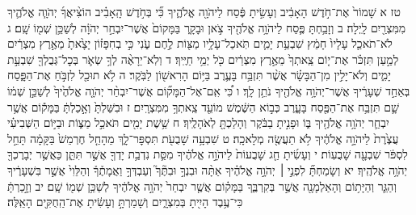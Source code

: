 \documentclass[twoside, openany, parskip=half, 11pt]{book}
\begin{document}
טז א שָׁמוֹר֙ אֶת־חֹ֣דֶשׁ הָאָבִ֔יב וְעָשִׂ֣יתָ פֶּ֔סַח לַיהֹוָ֖ה אֱלֹהֶ֑יךָ כִּ֞י בְּחֹ֣דֶשׁ הָֽאָבִ֗יב הוֹצִ֨יאֲךָ֜ יְהֹוָ֧ה אֱלֹהֶ֛יךָ מִמִּצְרַ֖יִם לָֽיְלָה׃ ב וְזָבַ֥חְתָּ פֶּ֛סַח לַיהֹוָ֥ה אֱלֹהֶ֖יךָ צֹ֣אן וּבָקָ֑ר בַּמָּקוֹם֙ אֲשֶׁר־יִבְחַ֣ר יְהֹוָ֔ה לְשַׁכֵּ֥ן שְׁמ֖וֹ שָֽׁם׃ ג לֹא־תֹאכַ֤ל עָלָיו֙ חָמֵ֔ץ שִׁבְעַ֥ת יָמִ֛ים תֹּֽאכַל־עָלָ֥יו מַצּ֖וֹת לֶ֣חֶם עֹ֑נִי כִּ֣י בְחִפָּז֗וֹן יָצָ֙אתָ֙ מֵאֶ֣רֶץ מִצְרַ֔יִם לְמַ֣עַן תִּזְכֹּ֗ר אֶת־י֤וֹם צֵֽאתְךָ֙ מֵאֶ֣רֶץ מִצְרַ֔יִם כֹּ֖ל יְמֵ֥י חַיֶּֽיךָ׃ ד וְלֹֽא־יֵרָאֶ֨ה לְךָ֥ שְׂאֹ֛ר בְּכׇל־גְּבֻלְךָ֖ שִׁבְעַ֣ת יָמִ֑ים וְלֹא־יָלִ֣ין מִן־הַבָּשָׂ֗ר אֲשֶׁ֨ר תִּזְבַּ֥ח בָּעֶ֛רֶב בַּיּ֥וֹם הָרִאשׁ֖וֹן לַבֹּֽקֶר׃ ה לֹ֥א תוּכַ֖ל לִזְבֹּ֣חַ אֶת־הַפָּ֑סַח בְּאַחַ֣ד שְׁעָרֶ֔יךָ אֲשֶׁר־יְהֹוָ֥ה אֱלֹהֶ֖יךָ נֹתֵ֥ן לָֽךְ׃ ו כִּ֠י אִֽם־אֶל־הַמָּק֞וֹם אֲשֶׁר־יִבְחַ֨ר יְהֹוָ֤ה אֱלֹהֶ֙יךָ֙ לְשַׁכֵּ֣ן שְׁמ֔וֹ שָׁ֛ם תִּזְבַּ֥ח אֶת־הַפֶּ֖סַח בָּעָ֑רֶב כְּב֣וֹא הַשֶּׁ֔מֶשׁ מוֹעֵ֖ד צֵֽאתְךָ֥ מִמִּצְרָֽיִם׃ ז וּבִשַּׁלְתָּ֙ וְאָ֣כַלְתָּ֔ בַּמָּק֕וֹם אֲשֶׁ֥ר יִבְחַ֛ר יְהֹוָ֥ה אֱלֹהֶ֖יךָ בּ֑וֹ וּפָנִ֣יתָ בַבֹּ֔קֶר וְהָלַכְתָּ֖ לְאֹהָלֶֽיךָ׃ ח שֵׁ֥שֶׁת יָמִ֖ים תֹּאכַ֣ל מַצּ֑וֹת וּבַיּ֣וֹם הַשְּׁבִיעִ֗י עֲצֶ֙רֶת֙ לַיהֹוָ֣ה אֱלֹהֶ֔יךָ לֹ֥א תַעֲשֶׂ֖ה מְלָאכָֽה׃
ט שִׁבְעָ֥ה שָׁבֻעֹ֖ת תִּסְפׇּר־לָ֑ךְ מֵהָחֵ֤ל חֶרְמֵשׁ֙ בַּקָּמָ֔ה תָּחֵ֣ל לִסְפֹּ֔ר שִׁבְעָ֖ה שָׁבֻעֽוֹת׃ י וְעָשִׂ֜יתָ חַ֤ג שָׁבֻעוֹת֙ לַיהֹוָ֣ה אֱלֹהֶ֔יךָ מִסַּ֛ת נִדְבַ֥ת יָדְךָ֖ אֲשֶׁ֣ר תִּתֵּ֑ן כַּאֲשֶׁ֥ר יְבָרֶכְךָ֖ יְהֹוָ֥ה אֱלֹהֶֽיךָ׃ יא וְשָׂמַחְתָּ֞ לִפְנֵ֣י ׀ יְהֹוָ֣ה אֱלֹהֶ֗יךָ אַתָּ֨ה וּבִנְךָ֣ וּבִתֶּ֘ךָ֮ וְעַבְדְּךָ֣ וַאֲמָתֶ֒ךָ֒ וְהַלֵּוִי֙ אֲשֶׁ֣ר בִּשְׁעָרֶ֔יךָ וְהַגֵּ֛ר וְהַיָּת֥וֹם וְהָאַלְמָנָ֖ה אֲשֶׁ֣ר בְּקִרְבֶּ֑ךָ בַּמָּק֗וֹם אֲשֶׁ֤ר יִבְחַר֙ יְהֹוָ֣ה אֱלֹהֶ֔יךָ לְשַׁכֵּ֥ן שְׁמ֖וֹ שָֽׁם׃ יב וְזָ֣כַרְתָּ֔ כִּי־עֶ֥בֶד הָיִ֖יתָ בְּמִצְרָ֑יִם וְשָׁמַרְתָּ֣ וְעָשִׂ֔יתָ אֶת־הַֽחֻקִּ֖ים הָאֵֽלֶּה׃
\end{document}
